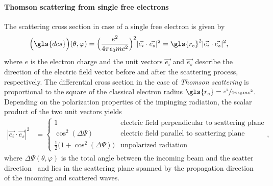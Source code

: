 \paragraph{Thomson scattering from single free electrons}
The scattering cross section in case of a single free electron is given by
\begin{align}
 \Big(\gls{dcs}\Big)(\theta, \varphi) &= \Big(\frac{e^2}{4 \pi \epsilon_0 m c^2}\Big)^2 |\vec{e_i} \cdot \vec{e_s}|^2 = \gls{r_e}^2 |\vec{e_i} \cdot \vec{e_s}|^2 \text{,} \label{ch_theo:eqn_thomson_scattering}
\end{align}
where $e$ is the electron charge and the unit vectors $\vec{e_i}$ and $\vec{e_s}$ describe the direction of the electric field vector before and after the scattering process, respectively. The differential cross section in the case of \emph{Thomson scattering} is proportional to the square of the classical electron radius $\gls{r_e}=\sfrac{e^2}{4 \pi \epsilon_0 m c^2}$. Depending on the polarization properties of the impinging radiation, the scalar product of the two unit vectors yields
\begin{align}
|\vec{e_i} \cdot \vec{e_s}|^2 &= \begin{cases}
    1 & \text{electric field perpendicular to scattering plane} \\
    \cos^2(\Delta \Psi) & \text{electric field parallel to scattering plane} \\
    \frac{1}{2}\big(1+\cos^2(\Delta \Psi)\big) & \text{unpolarized radiation}
\end{cases} \text{,}
\end{align}
where $\Delta \Psi(\theta, \varphi)$ is the total angle between the incoming beam and the scatter direction~\cite{als-nielsen_x-rays_2011} and lies in the scattering plane spanned by the propagation direction of the incoming and scattered waves.

